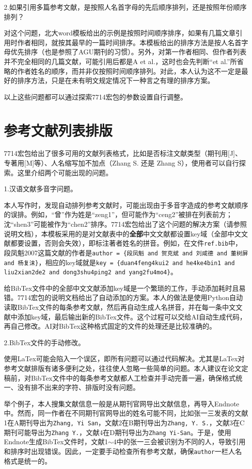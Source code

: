 2.如果引用多篇参考文献，是按照人名首字母的先后顺序排列，还是按照年份顺序排列？

对这个问题，北大word模板给出的示例是按照时间顺序排序，如果有几篇文章引用时作者相同，就按其最早的一篇时间排序。本模板给出的排序方法是按人名首字母优先排序（也是参照了AGU期刊的习惯）。另外，对第一作者相同、但作者列表并不完全相同的几篇文献，可能引用后都是A et al.，这时也会先判断“et al.”所省略的作者姓名的顺序，而并非仅按照时间顺序排列。对此，本人认为这不一定是最好的排序方法，只是在未有明文规定情况下一种言之有理的排序方案。

以上这些问题都可以通过探索7714宏包的参数设置自行调整。

\section{参考文献列表排版}

7714宏包给出了很多可用的文献列表格式，比如是否标注文献类型（期刊用[J]、专著用[M]等）、人名缩写加不加点（Zhang S. 还是 Zhang S），使用者可以自行探索。这里介绍两个可能出现的问题。

1.汉语文献多音字问题。

本人写作时，发现自动排列参考文献时，可能出现由于多音字造成的参考文献顺序的误排。例如，“曾”作为姓是“zeng1”，但可能作为“ceng2”被排在列表前方；沈“shen3”可能被作为“chen2”排序。7714宏包给出了这个问题的解决方案（请参照说明文档），本模板采用的是对文献表中的\textbf{全部}中文文献都设置key域（全部中文文献都要设置，否则会失效），即标注著者姓名的拼音。例如，在文件\texttt{ref.bib}中，段凤魁2007这篇文献的作者是\texttt{author = \{段凤魁 and 贺克斌 and 刘咸德 and 董树屏 and 杨复沫\}}，相应的key域就是\texttt{key = \{duan4feng4kui2 and he4ke4bin1 and liu2xian2de2 and dong3shu4ping2 and yang2fu4mo4\}}。

给BibTex文件中的全部中文文献添加key域是一个繁琐的工作，手动添加耗时且易错。7714宏包的说明文档给出了自动添加的方案。本人的做法是使用Python自动读取BibTex文件的每条参考文献，然后再自动生成人名拼音，并在每一条中文文献中添加key域，最后输出新的BibTex文件。这个过程可以交给AI自动生成代码，再自己修改。AI对BibTex这种格式固定的文件的处理还是比较准确的。

2.BibTex文件的手动修改。

使用LaTex可能会陷入一个误区，即所有问题可以通过代码解决。尤其是LaTex对参考文献排版有诸多便利之处，往往使人忽略一些简单的问题。本人建议在论文定稿前，对BibTex文件中的每条参考文献都人工检查并手动完善一遍，确保格式统一、没有排不出来的字符、排版时没有问题。

举个例子，本人搜集文献信息一般是从期刊官网导出文献信息，再导入Endnote中。然而，同一作者在不同期刊官网导出的姓名可能不同，比如张一三发表的文献1在A期刊导出为\texttt{Zhang, Yi San}，文献2在B期刊导出为\texttt{Zhang, Y. S.}，文献3在C期刊可能导出为\texttt{Zhang Y.}，文献4在D期刊导出为\texttt{Zhang Yi-San}。于是，使用Endnote生成BibTex文件时，文献1$\sim$4中的张一三会被识别为不同的人，导致引用和排序时出现错误。因此，一定要手动检查所有参考文献，确保\texttt{author}一栏人名格式是统一的。

